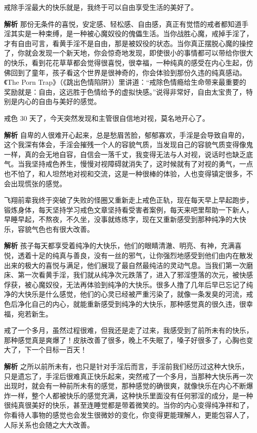 \begin{case}[那份弥足珍贵的自由感]
    戒除手淫最大的快乐就是，我终于可以自由享受生活的美好了。

    \textbf{解析} 那份无条件的喜悦，安定感、轻松感、自由感，真正有觉悟的戒者都知道手淫其实是一种束缚，是一种被心魔奴役的傀儡生活。当你战胜心魔，戒掉手淫了，才有自由可言，看黄手淫不是自由，那是被奴役的状态。当你真正摆脱心魔的操控了，你就会发现一个新天地，你会惊奇地发现，即使很小的事情都可以带给你很大的快乐，看到花花草草都会觉得很喜悦，很幸福，一种纯真的感受在内心生起，仿佛回到了童年，孩子看这个世界是很神奇的，你会体验到那份久违的纯真感动。《The Porn Trap》（《跳出色情陷阱》）里讲道：“戒除色情瘾给生命带来最重要的奖励就是：自由，这远胜于色情给予的虚拟快感。”说得非常好，自由太宝贵了，特别是内心的自由与美好的感觉。
\end{case}

\begin{case}[由自信带来的快乐]
    戒色 30 天了，今天突然发现和主管很自信地对视，莫名地开心了。

    \textbf{解析} 自卑的人很难开心起来，总是愁眉苦脸，郁郁寡欢，手淫是会导致自卑的，这个我深有体会，手淫会摧残一个人的容貌气质，当发现自己的容貌气质变得像鬼一样，真的会无地自容，自信会一落千丈，我变得无法与人对视，说话时也缺乏底气。当我坚持戒色养生，慢慢对视障碍就消失了，这时候就有了对视的勇气，一点也不怕了，和人坦然地对视和交流，这是一种很棒的体验，人也变得镇定很多，不会出现慌张的感觉。
\end{case}

\begin{case}[纯净的大快乐]
    飞翔前辈我终于突破了失败的怪圈又重新走上戒色正轨，现在每天早上早起跑步，锻炼身体，每天坚持学习戒色文章坚持看受害者案例，每天来吧里帮助一下新人，早睡早起，不熬夜，不久坐，没事就练练字，现在又重新感受到那种纯净的大快乐，容貌气色也有很大改善。

    \textbf{解析} 孩子每天都享受着纯净的大快乐，他们的眼睛清澈、明亮、有神，充满喜悦，透着十足的纯真与善良，没有一丝的邪气，让你强烈地感受到他们由内在散发出来的极大的喜悦与满足，他们展现了最自然最纯洁的灵动气息。当我们第一次磨床、第一次看黄手淫，我们就从纯净次元跌落了，进入了邪淫堕落的次元，被快感俘获，被心魔奴役，无法再体验到纯净的大快乐。很多人撸了几年后早已忘记了纯净的大快乐是什么感觉，他们的心灵已经被严重污染了，就像一条发臭的河流，戒色后净化自己的内心，就能重新感受到纯净的大快乐，那种感觉真的很久违，很幸福，宛若新生。
\end{case}

\begin{case}[前所未有的快乐]
    戒了一个多月，虽然过程很难，但我还是走了过来，我感受到了前所未有的快乐，那种感觉真是爽爆了！皮肤改善了很多，晚上不失眠了，嗓子好很多了，心胸也变大了，下一个目标一百天！

    \textbf{解析} 之所以前所未有，也只是针对手淫后而言，手淫前我们经历过这种大快乐，只是遗忘了，手淫后很难真正快乐起来，突然戒了一个多月，当那种大快乐再一次出现时，就会有一种前所未有的感觉，那种感觉的确很爽，就像快乐在内心不断爆炸一样，整个人都被快乐的感觉充满，这种快乐里面没有任何邪淫的成分，是一种很纯真很美好的快乐，甚至连睡觉都是带着微笑的。当你的内心变得纯净祥和了，你看待人事物的感觉也会发生很微妙的变化，你变得更能理解人，更能包容人了，人际关系也会随之大大改善。
\end{case}

